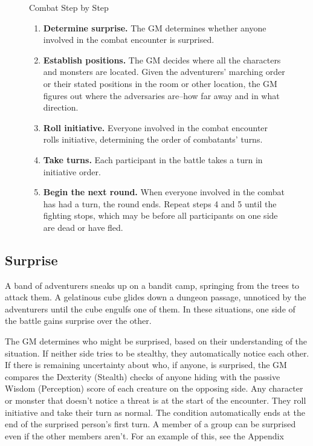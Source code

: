 \begin{figure}[htb]
    \begin{DndComment}{Combat Step by Step\label{cmt:combat-step-by-step}}
        \begin{enumerate}
            \item \textbf{Determine surprise.} The GM determines whether anyone involved in the combat encounter is surprised.
            \item \textbf{Establish positions.} The GM decides where all the characters and monsters are located. Given the adventurers' marching order or their stated positions in the room or other location, the GM figures out where the adversaries are--how far away and in what direction.
            \item \textbf{Roll initiative.} Everyone involved in the combat encounter rolls initiative, determining the order of combatants' turns.
            \item \textbf{Take turns.} Each participant in the battle takes a turn in initiative order.
            \item \textbf{Begin the next round.} When everyone involved in the combat has had a turn, the round ends. Repeat steps 4 and 5 until the fighting stops, which may be before all participants on one side are dead or have fled.
        \end{enumerate}
    \end{DndComment}
\end{figure}

\subsection{Surprise}

A band of adventurers sneaks up on a bandit camp, springing from the trees to attack them. A gelatinous cube glides down a dungeon passage, unnoticed by the adventurers until the cube engulfs one of them. In these situations, one side of the battle gains surprise over the other.

The GM determines who might be surprised, based on their understanding of the situation. If neither side tries to be stealthy, they automatically notice each other. If there is remaining uncertainty about who, if anyone, is surprised, the GM compares the Dexterity (Stealth) checks of anyone hiding with the passive Wisdom (Perception) score of each creature on the opposing side. Any character or monster that doesn't notice a threat is  at the start of the encounter. They roll initiative and take their turn as normal. The condition automatically ends at the end of the surprised person's first turn. A member of a group can be surprised even if the other members aren't. For an example of this, see the Appendix 


